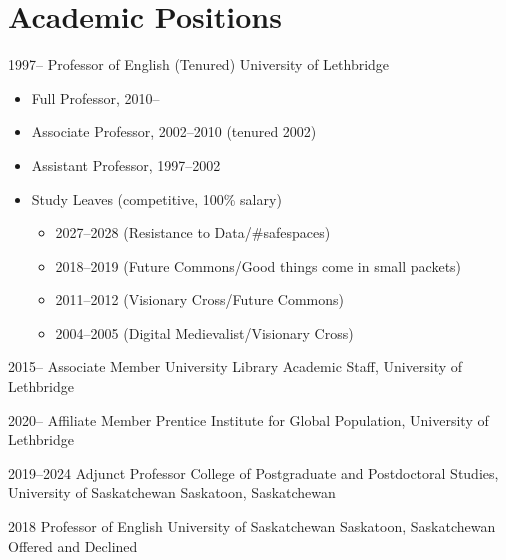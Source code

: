 \documentclass[11pt,letterpaper,sans]{moderncv}
\newif\ifcompactcv
\newcommand{\onlineonly}[1]{\ifcompactcv\else#1\fi}
\begin{document}
{\section{\textbf{Academic Positions}}
\onlineonly{}

\cventry
  {1997--}
  {Professor of English (Tenured)}
  {University of Lethbridge}
  {}
  {}
  {\begin{itemize}
    \item Full Professor, 2010--
    \item Associate Professor, 2002--2010 (tenured 2002)
    \item Assistant Professor, 1997--2002
    \item Study Leaves (competitive, 100\% salary)
    \begin{itemize}
      \item 2027--2028 (Resistance to Data/\#safespaces)
      \item 2018--2019 (Future Commons/Good things come in small packets)
      \item 2011--2012 (Visionary Cross/Future Commons)
      \item 2004--2005 (Digital Medievalist/Visionary Cross)
    \end{itemize}
  \end{itemize}}

\cventry
  {2015--}
  {Associate Member}
  {University Library Academic Staff, University of Lethbridge}
  {}
  {}
  {}

\cventry
  {2020--}
  {Affiliate Member}
  {Prentice Institute for Global Population, University of Lethbridge}
  {}
  {}
  {}

\cventry
  {2019--2024}
  {Adjunct Professor}
  {College of Postgraduate and Postdoctoral Studies, University of Saskatchewan}
  {Saskatoon, Saskatchewan}
  {}
  {}

\cventry
  {2018}
  {Professor of English}
  {University of Saskatchewan}
  {Saskatoon, Saskatchewan}
  {Offered and Declined}
  {}

}
\end{document}
